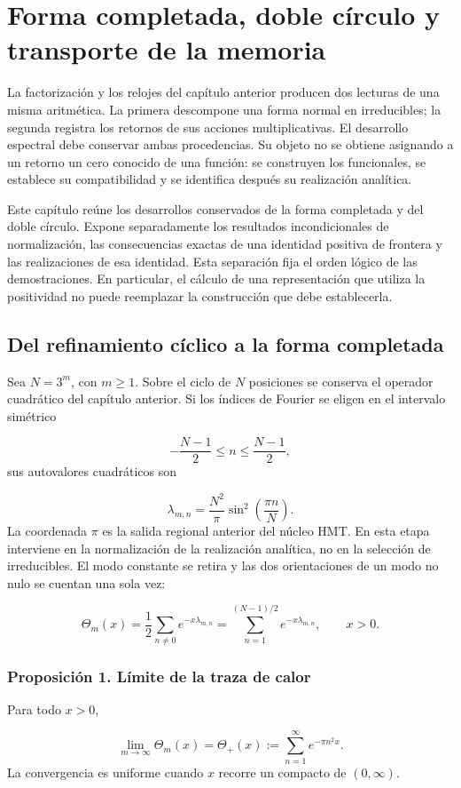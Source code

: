 \section{Forma completada, doble círculo y transporte de la memoria}
La factorización y los relojes del capítulo anterior producen dos lecturas de una misma aritmética. La primera descompone una forma normal en irreducibles; la segunda registra los retornos de sus acciones multiplicativas. El desarrollo espectral debe conservar ambas procedencias. Su objeto no se obtiene asignando a un retorno un cero conocido de una función: se construyen los funcionales, se establece su compatibilidad y se identifica después su realización analítica.

Este capítulo reúne los desarrollos conservados de la forma completada y del doble círculo. Expone separadamente los resultados incondicionales de normalización, las consecuencias exactas de una identidad positiva de frontera y las realizaciones de esa identidad. Esta separación fija el orden lógico de las demostraciones. En particular, el cálculo de una representación que utiliza la positividad no puede reemplazar la construcción que debe establecerla.

\subsection{Del refinamiento cíclico a la forma completada}
Sea \(N=3^m\), con \(m\geq1\). Sobre el ciclo de \(N\) posiciones se conserva el operador cuadrático del capítulo anterior. Si los índices de Fourier se eligen en el intervalo simétrico

\[
-\frac{N-1}{2}\leq n\leq\frac{N-1}{2},
\]
sus autovalores cuadráticos son

\[
\lambda_{m,n}=\frac{N^2}{\pi}\sin^2\!\left(\frac{\pi n}{N}\right).
\]
La coordenada \(\pi\) es la salida regional anterior del núcleo HMT. En esta etapa interviene en la normalización de la realización analítica, no en la selección de irreducibles. El modo constante se retira y las dos orientaciones de un modo no nulo se cuentan una sola vez:

\[
\Theta_m(x)=\frac12\sum_{n\neq0}e^{-x\lambda_{m,n}}
=\sum_{n=1}^{(N-1)/2}e^{-x\lambda_{m,n}},\qquad x>0.
\]
\subsubsection*{Proposición 1. Límite de la traza de calor}
Para todo \(x>0\),

\[
\lim_{m\to\infty}\Theta_m(x)
=\Theta_+(x):=\sum_{n=1}^{\infty}e^{-\pi n^2x}.
\]
La convergencia es uniforme cuando \(x\) recorre un compacto de \((0,\infty)\).

